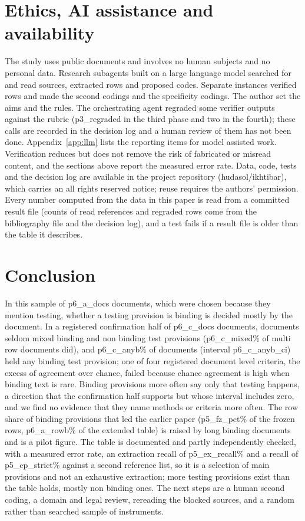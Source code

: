 \documentclass[conference]{IEEEtran}
\begin{document}
\section{Ethics, AI assistance and availability}\label{sec:ethics}
The study uses public documents and involves no human subjects and no personal data. Research subagents built on a large language model searched for and read sources, extracted rows and proposed codes. Separate instances verified rows and made the second codings and the specificity codings. The author set the aims and the rules. The orchestrating agent regraded some verifier outputs against the rubric ({{p3_regraded}} in the third phase and two in the fourth); these calls are recorded in the decision log and a human review of them has not been done. Appendix~\ref{app:llm} lists the reporting items for model assisted work. Verification reduces but does not remove the risk of fabricated or misread content, and the sections above report the measured error rate. Data, code, tests and the decision log are available in the project repository (hudasol/ikhtibar), which carries an all rights reserved notice; reuse requires the authors' permission. Every number computed from the data in this paper is read from a committed result file (counts of read references and regraded rows come from the bibliography file and the decision log), and a test fails if a result file is older than the table it describes.

\section{Conclusion}
In this sample of {{p6_a_docs}} documents, which were chosen because they mention testing, whether a testing provision is binding is decided mostly by the document. In a registered confirmation half of {{p6_c_docs}} documents, documents seldom mixed binding and non binding test provisions ({{p6_c_mixed}}\% of multi row documents did), and {{p6_c_anyb}}\% of documents (interval {{p6_c_anyb_ci}}) held any binding test provision; one of four registered document level criteria, the excess of agreement over chance, failed because chance agreement is high when binding text is rare. Binding provisions more often say only that testing happens, a direction that the confirmation half supports but whose interval includes zero, and we find no evidence that they name methods or criteria more often. The row share of binding provisions that led the earlier paper ({{p5_fz_pct}}\% of the frozen rows, {{p6_a_rowb}}\% of the extended table) is raised by long binding documents and is a pilot figure. The table is documented and partly independently checked, with a measured error rate, an extraction recall of {{p5_ex_recall}}\% and a recall of {{p5_cp_strict}}\% against a second reference list, so it is a selection of main provisions and not an exhaustive extraction; more testing provisions exist than the table holds, mostly non binding ones. The next steps are a human second coding, a domain and legal review, rereading the blocked sources, and a random rather than searched sample of instruments.
\end{document}
